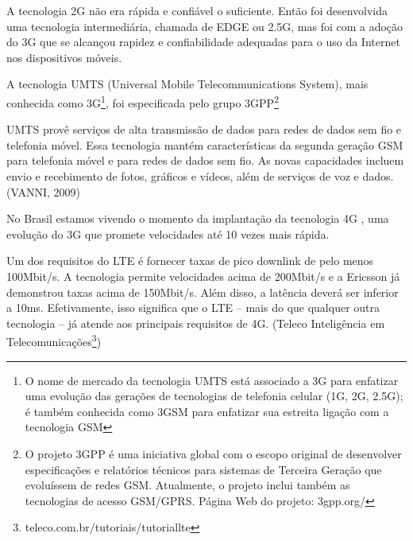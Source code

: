 A tecnologia 2G não era rápida e confiável o suficiente. Então foi desenvolvida uma tecnologia intermediária, chamada de EDGE ou 2.5G, mas foi com a adoção do 3G que se alcançou rapidez e confiabilidade adequadas para o uso da Internet nos dispositivos móveis.
\begin{citacao}
A tecnologia UMTS (Universal Mobile Telecommunications System), mais conhecida como 3G\footnote{O nome de mercado da tecnologia UMTS está associado a 3G para enfatizar uma evolução das gerações de tecnologias de telefonia celular (1G, 2G, 2.5G); é também conhecida como 3GSM para enfatizar sua estreita ligação com a tecnologia GSM}, foi especificada pelo grupo 3GPP\footnote{O projeto 3GPP é uma iniciativa global com o escopo original de desenvolver especificações e relatórios técnicos para sistemas de Terceira Geração que evoluíssem de redes GSM. Atualmente, o projeto inclui também as tecnologias de acesso GSM/GPRS. Página Web do projeto: 3gpp.org/}

UMTS provê serviços de alta transmissão de dados para redes de dados sem fio e telefonia móvel. Essa tecnologia mantém características da segunda geração GSM para telefonia móvel e  para redes de dados sem fio. As novas capacidades incluem envio e recebimento de fotos, gráficos e vídeos, além de serviços de voz e dados. (VANNI, 2009)
\end{citacao}

No Brasil estamos vivendo o momento da implantação da tecnologia 4G , uma evolução do 3G que promete velocidades até 10 vezes mais rápida.

\begin{citacao}
Um dos requisitos do LTE é fornecer taxas de pico downlink de pelo menos 100Mbit/s. A tecnologia permite velocidades acima de 200Mbit/s e a Ericsson já demonstrou taxas acima de 150Mbit/s. Além disso, a latência  deverá ser inferior a 10ms. Efetivamente, isso significa que o LTE – mais do que qualquer outra tecnologia – já atende aos principais requisitos de 4G. (Teleco Inteligência em Telecomunicações\footnote{teleco.com.br/tutoriais/tutoriallte})
\end{citacao}

